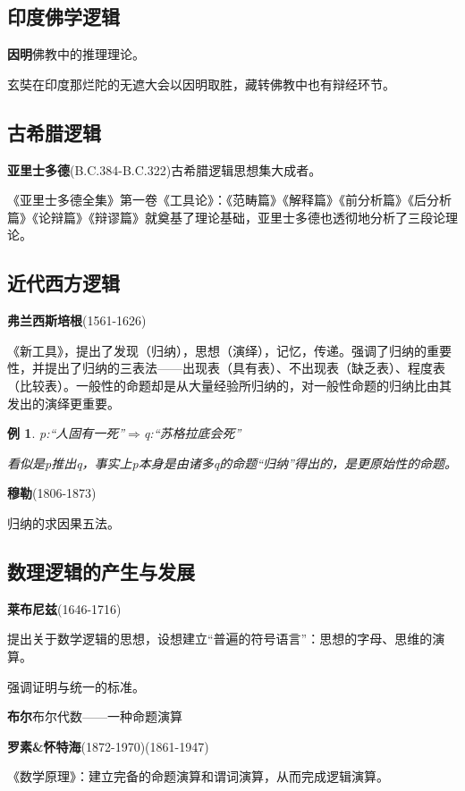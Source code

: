 \documentclass[12pt,onecolumn,a4paper]{book}
\newtheorem*{example}{例}
\numberwithin{table}{subsection}
\numberwithin{equation}{subsection}
\begin{document}
\subsection{印度佛学逻辑}

\textbf{因明}佛教中的推理理论。

玄奘在印度那烂陀的无遮大会以因明取胜，藏转佛教中也有辩经环节。

\subsection{古希腊逻辑}

\textbf{亚里士多德}(B.C.384-B.C.322)古希腊逻辑思想集大成者。

《亚里士多德全集》第一卷《工具论》：《范畴篇》《解释篇》《前分析篇》《后分析篇》《论辩篇》《辩谬篇》就奠基了理论基础，亚里士多德也透彻地分析了三段论理论。

\subsection{近代西方逻辑}

\textbf{弗兰西斯培根}(1561-1626)

《新工具》，提出了发现（归纳），思想（演绎），记忆，传递。强调了归纳的重要性，并提出了归纳的三表法——出现表（具有表）、不出现表（缺乏表）、程度表（比较表）。一般性的命题却是从大量经验所归纳的，对一般性命题的归纳比由其发出的演绎更重要。

\begin{example}
    p:“人固有一死”$\Rightarrow$q:“苏格拉底会死”

    看似是p推出q，事实上p本身是由诸多q的命题“归纳”得出的，是更原始性的命题。
\end{example}

\textbf{穆勒}(1806-1873)

归纳的求因果五法。

\subsection{数理逻辑的产生与发展}

\textbf{莱布尼兹}(1646-1716)

提出关于数学逻辑的思想，设想建立“普遍的符号语言”：思想的字母、思维的演算。

强调证明与统一的标准。

\textbf{布尔}布尔代数——一种命题演算

\textbf{罗素\&怀特海}(1872-1970)(1861-1947)

《数学原理》：建立完备的命题演算和谓词演算，从而完成逻辑演算。
\end{document}
